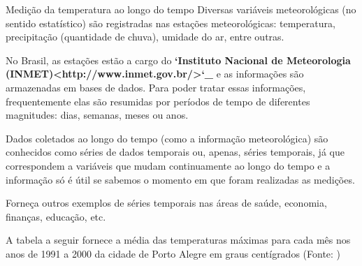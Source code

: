 \begin{task}{ Medição da temperatura ao longo do tempo}
Diversas variáveis meteorológicas (no sentido estatístico) são registradas nas estações meteorológicas: temperatura, precipitação (quantidade de chuva), umidade do ar, entre outras.

No Brasil, as estações estão a cargo do {\color{red}\bfseries{}{}`Instituto Nacional de Meteorologia (INMET)\textless{}http://www.inmet.gov.br/\textgreater{}{}`\_} e as informações são armazenadas em bases de dados. Para poder tratar essas informações, frequentemente elas são resumidas por períodos de tempo de diferentes magnitudes: dias, semanas, meses ou anos.

Dados coletados ao longo do tempo (como a informação meteorológica) são conhecidos como séries de dados temporais ou, apenas, séries temporais, já que correspondem a variáveis que mudam continuamente ao longo do tempo e a informação só é útil se sabemos o momento em que foram realizadas as medições.
\end{task}

\begin{reflection}

Forneça outros exemplos de séries temporais nas áreas de saúde, economia, finanças, educação, etc.
\end{reflection}

A tabela a seguir fornece a média das temperaturas máximas para cada mês nos anos de 1991 a 2000 da cidade de Porto Alegre em graus centígrados (Fonte: )


